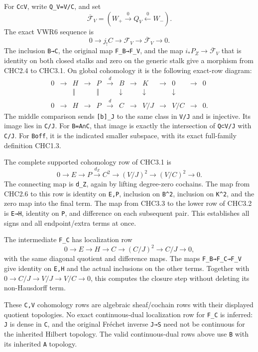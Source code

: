 For \texttt{C⊂V}, write \texttt{Q\_V=V/C}, and set \[
\overline{\mathcal F}_V=(W_+\xrightarrow0Q_V\xleftarrow0W_-).
\] The exact VWR6 sequence is \[
0\to j_!C\to\mathcal F_V\to\overline{\mathcal F}_V\to0.
\tag{CHC3.1}
\] The inclusion \texttt{B→C}, the original map \texttt{F\_B→F\_V}, and
the map \(i_*P_Z\to\overline{\mathcal F}_V\) that is identity on both
closed stalks and zero on the generic stalk give a morphism from CHC2.4
to CHC3.1. On global cohomology it is the following exact-row diagram:
\[
\begin{array}{ccccccccccccc}
0&\to&H&\to&P&\xrightarrow d&B&\to&K&\to&0&\to&0\\
&&\Vert&&\Vert&&\downarrow&&\downarrow&&\downarrow\\
0&\to&H&\to&P&\xrightarrow d&C&\to&V/J&\to&V/C&\to&0.
\end{array}
\tag{CHC3.2}
\] The middle comparison sends \texttt{{[}b{]}\_J} to the same class in
\texttt{V/J} and is injective. Its image lies in \texttt{C/J}. For
\texttt{B=A∩C}, that image is exactly the intersection of \texttt{Q⊂V/J}
with \texttt{C/J}. For \texttt{Boff}, it is the indicated smaller
subspace, with its exact full-family definition CHC1.3.

The complete supported cohomology row of CHC3.1 is \[
0\to E\to P\xrightarrow{d_Z}C^2
\to(V/J)^2\to(V/C)^2\to0.
\tag{CHC3.3}
\] The connecting map is \texttt{d\_Z}, again by lifting degree-zero
cochains. The map from CHC2.6 to this row is identity on \texttt{E,P},
inclusion on \texttt{B\^{}2}, inclusion on \texttt{K\^{}2}, and the zero
map into the final term. The map from CHC3.3 to the lower row of CHC3.2
is \texttt{E→H}, identity on \texttt{P}, and difference on each
subsequent pair. This establishes all signs and all endpoint/extra terms
at once.

The intermediate \texttt{F\_C} has localization row \[
0\to E\to H\to C\to(C/J)^2\to C/J\to0,
\tag{CHC3.4}
\] with the same diagonal quotient and difference maps. The maps
\texttt{F\_B→F\_C→F\_V} give identity on \texttt{E,H} and the actual
inclusions on the other terms. Together with
\(0\to C/J\to V/J\to V/C\to0\), this computes the closure step without
deleting its non-Hausdorff term.

These \texttt{C,V} cohomology rows are algebraic sheaf/cochain rows with
their displayed quotient topologies. No exact continuous-dual
localization row for \texttt{F\_C} is inferred: \texttt{J} is dense in
\texttt{C}, and the original Fréchet inverse \texttt{J→S} need not be
continuous for the inherited Hilbert topology. The valid continuous-dual
rows above use \texttt{B} with its inherited \texttt{A} topology.

